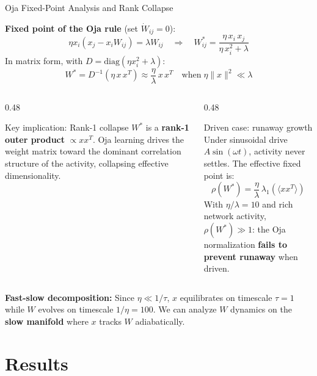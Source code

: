 \documentclass[11pt,aspectratio=169]{beamer}
\begin{document}
\begin{frame}{Oja Fixed-Point Analysis and Rank Collapse}

\textbf{Fixed point of the Oja rule} (set $\dot{W}_{ij} = 0$):
\[
\eta x_i(x_j - x_i W_{ij}) = \lambda W_{ij}
\quad\Rightarrow\quad
W_{ij}^* = \frac{\eta\,x_i\,x_j}{\eta\,x_i^2 + \lambda}
\]
In matrix form, with $D = \mathrm{diag}(\eta x_i^2 + \lambda)$:
\[
\boxed{W^* = D^{-1}\!\left(\eta\, x\,x^T\right)
         \approx \frac{\eta}{\lambda}\,x\,x^T \quad\text{when}\;\eta\|x\|^2 \ll \lambda}
\]

\begin{columns}[T]
\begin{column}{0.48\textwidth}
\begin{alertblock}{Key implication: Rank-1 collapse}
$W^*$ is a \textbf{rank-1 outer product} $\propto x x^T$.
Oja learning drives the weight matrix toward the dominant correlation structure
of the activity, collapsing effective dimensionality.
\end{alertblock}
\end{column}
\begin{column}{0.48\textwidth}
\begin{block}{Driven case: runaway growth}
Under sinusoidal drive $A\sin(\omega t)$, activity never settles.
The effective fixed point is:
\[
\rho(W^*) = \frac{\eta}{\lambda}\,\lambda_1\!\left(\langle x x^T\rangle\right)
\]
With $\eta/\lambda = 10$ and rich network activity,
$\rho(W^*) \gg 1$: the Oja normalization
\textbf{fails to prevent runaway} when driven.
\end{block}
\end{column}
\end{columns}

\vspace{0.3em}
\small
\textbf{Fast-slow decomposition:} Since $\eta \ll 1/\tau$, $x$ equilibrates on
timescale $\tau=1$ while $W$ evolves on timescale $1/\eta = 100$.
We can analyze $W$ dynamics on the \textbf{slow manifold} where
$x$ tracks $W$ adiabatically.
\end{frame}

\section{Results}
\end{document}
